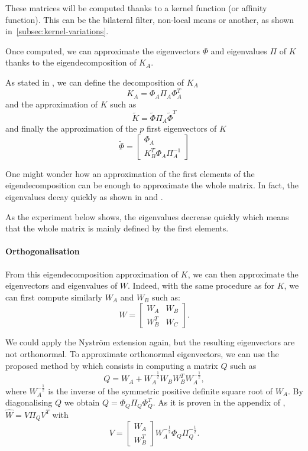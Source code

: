 These matrices will be computed thanks to a kernel function (or affinity function). This can be the bilateral filter, non-local means or another, as shown in~\ref{subsec:kernel-variations}.

Once computed, we can approximate the eigenvectors \(\Phi\) and eigenvalues \(\Pi\) of \(K\) thanks to the eigendecomposition of \(K_A\).

As stated in \cite{glide_2014}, we can define the decomposition of \(K_A\)
\[K_A = \Phi_A \Pi_A \Phi_A^T\]
and the approximation of \(K\) such as
\[\tilde{K} = \tilde{\Phi} \Pi_A \tilde{\Phi}^T\]
and finally the approximation of the \(p\) first eigenvectors of \(K\)
\[
 \tilde{\Phi} = \begin{bmatrix}
  \Phi_A \\
  K_B^T \Phi_A \Pi_A^{-1}
 \end{bmatrix}
\]

One might wonder how an approximation of the first elements of the eigendecomposition can be enough to approximate the whole matrix.
In fact, the eigenvalues decay quickly as shown in \cite{siam_slides_2016} and \cite{meyer_perturbation_2014}.

As the experiment below shows, the eigenvalues decrease quickly which means that the whole matrix is mainly defined by the first elements.


\paragraph{Orthogonalisation}
From this eigendecomposition approximation of \(K\), we can then approximate the eigenvectors and eigenvalues of \(W\).
Indeed, with the same procedure as for \(K\), we can first compute similarly \(W_A\) and \(W_B\) such as:
\[
 W = \begin{bmatrix}
  W_A & W_B \\
  W_B^T & W_C
 \end{bmatrix}.
\]

We could apply the Nystr\"om extension again, but the resulting eigenvectors are not orthonormal.
To approximate orthonormal eigenvectors, we can use the proposed method by \cite{fowlkes_spectral_2004} which consists in computing a matrix \(Q\) such as
\[Q = W_A + W_A^{-\frac{1}{2}} W_B W_B^T W_A^{-\frac{1}{2}},\]
where \(W_A^{-\frac{1}{2}}\) is the inverse of the symmetric positive definite square root of \(W_A\).
By diagonalising \(Q\) we obtain \(Q = \Phi_Q \Pi_Q \Phi_Q^T\).
As it is proven in the appendix of \cite{fowlkes_spectral_2004}, \(\hat{W} = V\Pi_QV^T\) with
\[
 V = \begin{bmatrix}
  W_A \\
  W_B^T
 \end{bmatrix}
 W_A^{-\frac{1}{2}} \Phi_Q \Pi_Q^{-\frac{1}{2}}.
\]

